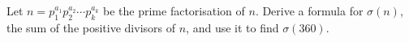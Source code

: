 Let $n=p_1^{a_1}p_2^{a_2}\cdots p_k^{a_k}$ be the prime factorisation of $n$. Derive a formula for $\sigma(n)$, the sum of the positive divisors of $n$, and use it to find $\sigma(360)$.
